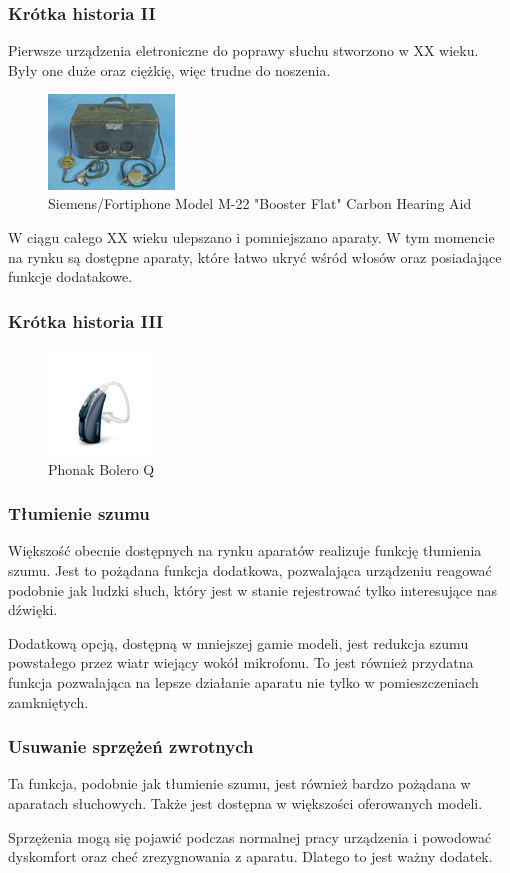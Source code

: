 \documentclass{beamer}
\begin{document}
\begin{frame}
\frametitle{Krótka historia II}
Pierwsze urządzenia eletroniczne do poprawy słuchu stworzono w XX wieku. Były one duże oraz ciężkię, więc trudne do noszenia.
\begin{figure}
    \includegraphics[width=0.3\textwidth]{siemens_old}
    \caption{Siemens/Fortiphone Model M-22 "Booster Flat" Carbon Hearing Aid}
    \label{fig:siemens-old}
\end{figure}
\end{frame}

\begin{frame}
W ciągu całego XX wieku ulepszano i pomniejszano aparaty. W tym momencie na rynku są dostępne aparaty, które łatwo ukryć wśród włosów oraz posiadające funkcje dodatakowe.
\frametitle{Krótka historia III}
\begin{figure}
    \includegraphics[width=0.25\textwidth]{phonak}
    \caption{Phonak Bolero Q}
    \label{fig:phonak}
\end{figure}
\end{frame}

\begin{frame}
\frametitle{Tłumienie szumu}
Większość obecnie dostępnych na rynku aparatów realizuje funkcję tłumienia szumu. Jest to pożądana funkcja dodatkowa, pozwalająca urządzeniu reagować podobnie jak ludzki słuch, który jest w stanie rejestrować tylko interesujące nas dźwięki. 

Dodatkową opcją, dostępną w mniejszej gamie modeli, jest redukcja szumu powstałego przez wiatr wiejący wokół mikrofonu. To jest również przydatna funkcja pozwalająca na lepsze działanie aparatu nie tylko w pomieszczeniach zamkniętych.
\end{frame}

\begin{frame}
\frametitle{Usuwanie sprzężeń zwrotnych}
Ta funkcja, podobnie jak tłumienie szumu, jest również bardzo pożądana w aparatach słuchowych. Także jest dostępna w większości oferowanych modeli.

Sprzężenia mogą się pojawić podczas normalnej pracy urządzenia i powodować dyskomfort oraz cheć zrezygnowania z aparatu. Dlatego to jest ważny dodatek.
\end{frame}
\end{document}
